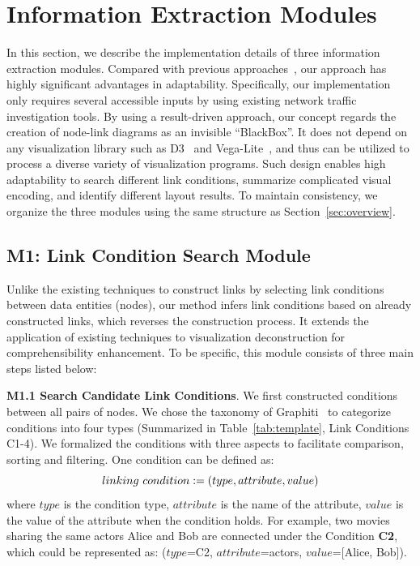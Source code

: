 \section{Information Extraction Modules}\label{sec:approach}
In this section, we describe the implementation details of three information extraction modules. Compared with previous approaches~\cite{DBLP:journals/tvcg/HarperA18, DBLP:conf/uist/HarperA14}, our approach has highly significant advantages in adaptability. Specifically, our implementation only requires several accessible inputs by using existing network traffic investigation tools. By using a result-driven approach, our concept regards the creation of node-link diagrams as an invisible ``BlackBox''. It does not depend on any visualization library such as D3~\cite{DBLP:journals/tvcg/BostockOH11} and Vega-Lite~\cite{DBLP:journals/tvcg/SatyanarayanMWH17}, and thus can be utilized to process a diverse variety of visualization programs. Such design enables high adaptability to search different link conditions, summarize complicated visual encoding, and identify different layout results. To maintain consistency, we organize the three modules using the same structure as Section~\ref{sec:overview}.

\subsection {M1: Link Condition Search Module}

Unlike the existing techniques to construct links by selecting link conditions between data entities (nodes), our method infers link conditions based on already constructed links, which reverses the construction process. It extends the application of existing techniques to visualization deconstruction for comprehensibility enhancement.
To be specific, this module consists of three main steps listed below:

\noindent \textbf{M1.1 Search Candidate Link Conditions}. 
We first constructed conditions between all pairs of nodes. We chose the taxonomy of Graphiti~\cite{DBLP:journals/tvcg/SrinivasanPEB18} to categorize conditions into four types (Summarized in Table~\ref{tab:template}, Link Conditions C1-4). We formalized the conditions with three aspects to facilitate comparison, sorting and filtering.
One condition can be defined as:
\begin{equation}
    \abovedisplayskip=5pt
    \abovedisplayshortskip=5pt
    \belowdisplayskip=5pt
    \belowdisplayshortskip=5pt
    linking\text{ }condition := ( type, attribute, value ) \label{def:linkingcondition}
\end{equation}
where $type$ is the condition type, $attribute$ is the name of the attribute, $value$ is the value of the attribute when the condition holds.
For example, two movies sharing the same actors Alice and Bob are connected under the Condition \textbf{C2}, which could be represented as: ($type$=C2, $attribute$=actors, $value$=[Alice, Bob]). 

